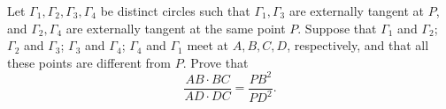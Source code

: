 Let $\Gamma_1, \Gamma_2, \Gamma_3, \Gamma_4$ be distinct circles such that $\Gamma_1, \Gamma_3$ are externally tangent at $P$, and $\Gamma_2, \Gamma_4$ are externally tangent at the same point $P$. Suppose that $\Gamma_1$ and $\Gamma_2$; $\Gamma_2$ and $\Gamma_3$; $\Gamma_3$ and $\Gamma_4$; $\Gamma_4$ and $\Gamma_1$ meet at $A, B, C, D$, respectively, and that all these points are different from $P$. Prove that
\[
\frac{AB \cdot BC}{AD \cdot DC} = \frac{PB^2}{PD^2}.
\]
